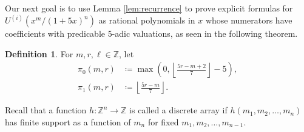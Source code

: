 \documentclass[12pt, reqno]{amsart}
\theoremstyle{definition}
\newtheorem{defn}[thm]{Definition}
\theoremstyle{remark}
\newcommand{\ZZ}{\mathbb{Z}}
\begin{document}
Our next goal is to use Lemma \ref{lem:recurrence} to prove explicit formulas for $U^{(i)}(x^m/ (1+5x)^n)$ as rational polynomials in $x$ whose numerators have coefficients with predicable 5-adic valuations, as seen in the following theorem. 

\begin{defn}
For $m,r,\ell \in \ZZ$, let
\begin{align*}
\pi_0(m,r) &\coloneqq \max\left(0, \left\lfloor \frac{5r-m+2}{7} \right\rfloor -5 \right), \\
\pi_1(m,r) &\coloneqq \left\lfloor \frac{5r-m}{7} \right\rfloor.
\end{align*}
\end{defn}

Recall that a function $h : \ZZ^n \rightarrow \ZZ$ is called a discrete array if $h(m_1, m_2, \dots, m_n)$ has finite support as a function of $m_n$ for fixed $m_1, m_2, \dots, m_{n-1}$.
\end{document}
